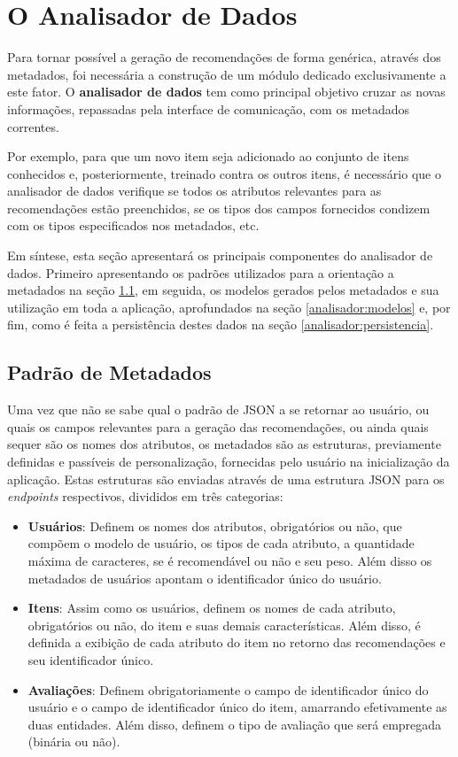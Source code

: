 \section{O Analisador de Dados} \label{analisador}

Para tornar possível a geração de recomendações de forma genérica, através dos metadados, foi necessária a construção de um módulo dedicado exclusivamente a este fator. O \textbf{analisador de dados} tem como principal objetivo cruzar as novas informações, repassadas pela interface de comunicação, com os metadados correntes.

Por exemplo, para que um novo item seja adicionado ao conjunto de itens conhecidos e, posteriormente, treinado contra os outros itens, é necessário que o analisador de dados verifique se todos os atributos relevantes para as recomendações estão preenchidos, se os tipos dos campos fornecidos condizem com os tipos especificados nos metadados, etc.

Em síntese, esta seção apresentará os principais componentes do analisador de dados. Primeiro apresentando os padrões utilizados para a orientação a metadados na seção \ref{analisador:padrao_metadados}, em seguida, os modelos gerados pelos metadados e sua utilização em toda a aplicação, aprofundados na seção \ref{analisador:modelos} e, por fim, como é feita a persistência destes dados na seção \ref{analisador:persistencia}.

\subsection{Padrão de Metadados} \label{analisador:padrao_metadados}

Uma vez que não se sabe qual o padrão de JSON a se retornar ao usuário, ou quais os campos relevantes para a geração das recomendações, ou ainda quais sequer são os nomes dos atributos, os metadados são as estruturas, previamente definidas e passíveis de personalização, fornecidas pelo usuário na inicialização da aplicação. Estas estruturas são enviadas através de uma estrutura JSON para os \textit{endpoints} respectivos, divididos em três categorias:

\begin{itemize}
	\item \textbf{Usuários}: Definem os nomes dos atributos, obrigatórios ou não, que compõem o modelo de usuário, os tipos de cada atributo, a quantidade máxima de caracteres, se é recomendável ou não e seu peso. Além disso os metadados de usuários apontam o identificador único do usuário.

	\item \textbf{Itens}: Assim como os usuários, definem os nomes de cada atributo, obrigatórios ou não, do item e suas demais características. Além disso, é definida a exibição de cada atributo do item no retorno das recomendações e seu identificador único.

	\item \textbf{Avaliações}: Definem obrigatoriamente o campo de identificador único do usuário e o campo de identificador único do item, amarrando efetivamente as duas entidades. Além disso, definem o tipo de avaliação que será empregada (binária ou não).
\end{itemize}

